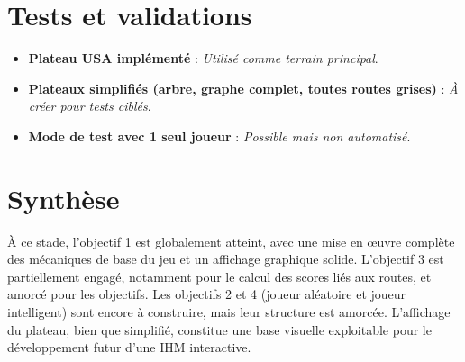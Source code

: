 \documentclass[a4paper,12pt]{report}
\begin{document}
\section*{Tests et validations}

\begin{itemize}
    \item \textbf{Plateau USA implémenté} : \textit{Utilisé comme terrain principal}.
    \item \textbf{Plateaux simplifiés (arbre, graphe complet, toutes routes grises)} : \textit{À créer pour tests ciblés}.
    \item \textbf{Mode de test avec 1 seul joueur} : \textit{Possible mais non automatisé}.
\end{itemize}

\section*{Synthèse}

À ce stade, l’objectif 1 est globalement atteint, avec une mise en œuvre complète des mécaniques de base du jeu et un
affichage graphique solide.
L’objectif 3 est partiellement engagé, notamment pour le calcul des scores liés aux routes, et amorcé pour les
objectifs.
Les objectifs 2 et 4 (joueur aléatoire et joueur intelligent) sont encore à construire, mais leur structure est amorcée.
L’affichage du plateau, bien que simplifié, constitue une base visuelle exploitable pour le développement futur d’une
IHM interactive.
\end{document}
